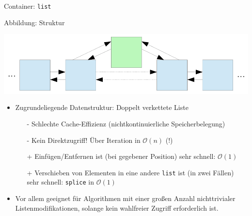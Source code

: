 \begin{frame}[fragile]{Container: \texttt{list}}
	\begin{block}{Abbildung: Struktur}
		\begin{center}
			\includegraphics[width=0.6\linewidth]{images/list.pdf}
		\end{center}
	\end{block}

	\begin{itemize}
		\item Zugrundeliegende Datenstruktur: Doppelt verkettete Liste
		\pause
		\begin{itemize}
			\item[-] Schlechte Cache-Effizienz (nichtkontinuierliche Speicherbelegung)
			\item[-] Kein Direktzugriff! Über Iteration in $\mathcal{O}(n)$ (!)
			\pause
			\item[+] Einfügen/Entfernen ist (bei gegebener Position) sehr schnell: $\mathcal{O}(1)$
			\item[+] Verschieben von Elementen in eine andere \verb|list| ist (in zwei Fällen) sehr schnell: \verb|splice| in $\mathcal{O}(1)$
		\end{itemize}
		\pause
		\item Vor allem geeignet für Algorithmen mit einer großen Anzahl nichttrivialer Listenmodifikationen, solange kein wahlfreier Zugriff erforderlich ist.
	\end{itemize}
\end{frame}

